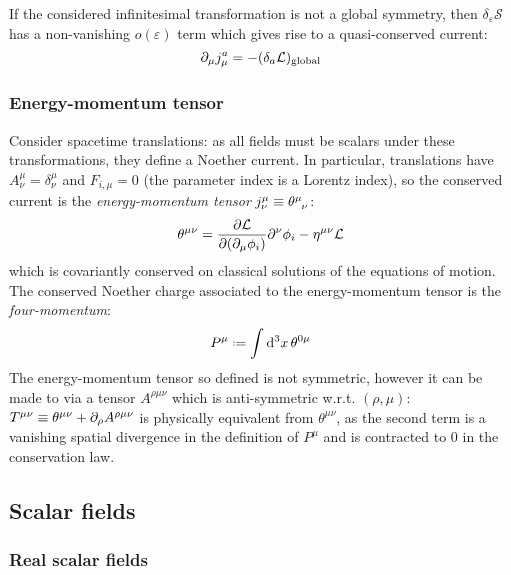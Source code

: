 If the considered infinitesimal transformation is not a global symmetry, then $ \delta_\varepsilon \mathcal{S} $ has a non-vanishing $ o(\varepsilon) $ term which gives rise to a quasi-conserved current:
\begin{equation}
  \partial_\mu j^a_\mu = - (\delta_a \mathcal{L})_\mathrm{global}
  \label{eq:1.69}
\end{equation}

\subsubsection{Energy-momentum tensor}

Consider spacetime translations: as all fields must be scalars under these transformations, they define a Noether current. In particular, translations have $ A^\mu_\nu = \delta^\mu_\nu $ and $ F_{i,\mu} = 0 $ (the parameter index is a Lorentz index), so the conserved current is the \textit{energy-momentum tensor} $ j^\mu_\nu \equiv \tensor{\theta}{^\mu_\nu} $:
\begin{equation}
  \theta^{\mu \nu} = \frac{\partial \mathcal{L}}{\partial (\partial_\mu \phi_i)} \partial^\nu \phi_i - \eta^{\mu \nu} \mathcal{L}
  \label{eq:1.70}
\end{equation}
which is covariantly conserved on classical solutions of the equations of motion. The conserved Noether charge associated to the energy-momentum tensor is the \textit{four-momentum}:
\begin{equation}
  P^\mu \defeq \int \dd^3 x\, \theta^{0 \mu}
  \label{eq:1.71}
\end{equation}
The energy-momentum tensor so defined is not symmetric, however it can be made to via a tensor $ A^{\rho \mu \nu} $ which is anti-symmetric w.r.t. $ (\rho,\mu) $: $ T^{\mu \nu} \equiv \theta^{\mu \nu} + \partial_\rho A^{\rho \mu \nu} $ is physically equivalent from $ \theta^{\mu \nu} $, as the second term is a vanishing spatial divergence in the definition of $ P^\mu $ and is contracted to 0 in the conservation law.

\subsection{Scalar fields}

\subsubsection{Real scalar fields}

